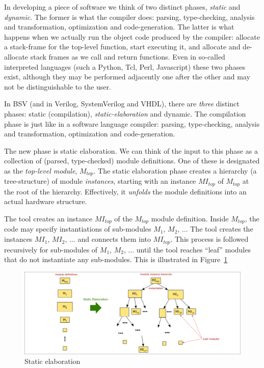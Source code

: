 \label{Sec_Static_Elaboration}


In developing a piece of software we think of two distinct phases,
\emph{static} and \emph{dynamic}.  The former is what the compiler
does: parsing, type-checking, analysis and transformation,
optimization and code-generation.  The latter is what happens when we
actually run the object code produced by the compiler: allocate a
stack-frame for the top-level function, start executing it, and
allocate and de-allocate stack frames as we call and return functions.
Even in so-called interpreted languages (such a Python, Tcl, Perl,
Javascript) these two phases exist, although they may be performed
adjacently one after the other and may not be distinguishable to the
user.

In BSV (and in Verilog, SystemVerilog and VHDL), there are
\emph{three} distinct phases: static (compilation),
\emph{static-elaboration} and dynamic.  The compilation phase is just
like in a software language compiler: parsing, type-checking, analysis
and transformation, optimization and code-generation.

The new phase is static elaboration.  We can think of the input to
this phase as a collection of (parsed, type-checked) module
definitions.  One of these is designated as the \emph{top-level
module}, $M_{top}$.  The static elaboration phase creates a hierarchy
(a tree-structure) of module \emph{instances}, starting with an
instance $MI_{top}$ of $M_{top}$ at the root of the hierarchy.
Effectively, it \emph{unfolds} the module definitions into an actual
hardware structure.

The tool creates an instance $MI_{top}$ of the $M_{top}$ module
definition. Inside $M_{top}$, the code may specify instantiations of
sub-modules $M_1$, $M_2$, ...  The tool creates the instances $MI_1$,
$MI_2$, ...  and connects them into $MI_{top}$.  This process is
followed recursively for sub-modules of $M_1$, $M_2$, ... until the
tool reaches ``leaf'' modules that do not instantiate any sub-modules.
This is illustrated in Figure~\ref{Fig_BSV_static_elaboration}
\begin{figure}[htbp]
  \centerline{\includegraphics[width=6in,angle=0]{Figures/Fig_BSV_static_elaboration}}
  \caption{\label{Fig_BSV_static_elaboration} Static elaboration}
\end{figure}

